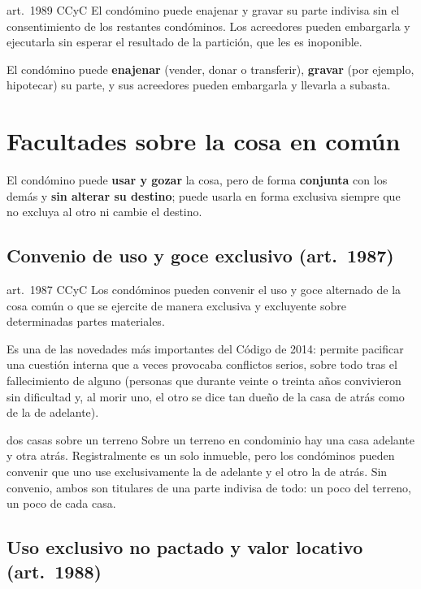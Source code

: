 \documentclass[12pt,oneside]{book}
\begin{document}
\begin{regla}{art.~1989 CCyC}
El condómino puede enajenar y gravar su parte indivisa sin el consentimiento de los restantes condóminos. Los acreedores pueden embargarla y ejecutarla sin esperar el resultado de la partición, que les es inoponible.
\end{regla}

El condómino puede \textbf{enajenar} (vender, donar o transferir), \textbf{gravar} (por ejemplo, hipotecar) su parte, y sus acreedores pueden embargarla y llevarla a subasta.

\section{Facultades sobre la cosa en común}

El condómino puede \textbf{usar y gozar} la cosa, pero de forma \textbf{conjunta} con los demás y \textbf{sin alterar su destino}; puede usarla en forma exclusiva siempre que no excluya al otro ni cambie el destino.

\subsection{Convenio de uso y goce exclusivo (art.~1987)}

\begin{regla}{art.~1987 CCyC}
Los condóminos pueden convenir el uso y goce alternado de la cosa común o que se ejercite de manera exclusiva y excluyente sobre determinadas partes materiales.
\end{regla}

Es una de las novedades más importantes del Código de 2014: permite pacificar una cuestión interna que a veces provocaba conflictos serios, sobre todo tras el fallecimiento de alguno (personas que durante veinte o treinta años convivieron sin dificultad y, al morir uno, el otro se dice tan dueño de la casa de atrás como de la de adelante).

\begin{ejemplo}{dos casas sobre un terreno}
Sobre un terreno en condominio hay una casa adelante y otra atrás. Registralmente es un solo inmueble, pero los condóminos pueden convenir que uno use exclusivamente la de adelante y el otro la de atrás. Sin convenio, ambos son titulares de una parte indivisa de todo: un poco del terreno, un poco de cada casa.
\end{ejemplo}

\subsection{Uso exclusivo no pactado y valor locativo (art.~1988)}
\end{document}
